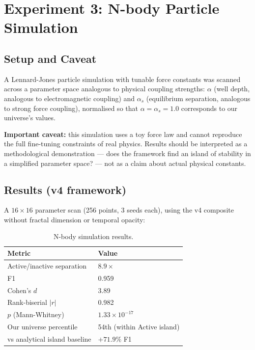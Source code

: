 \documentclass[12pt,a4paper]{article}
\begin{document}
\section{Experiment 3: N-body Particle Simulation}

\subsection{Setup and Caveat}

A Lennard-Jones particle simulation with tunable force constants was
scanned across a parameter space analogous to physical coupling
strengths: $\alpha$ (well depth, analogous to electromagnetic
coupling) and $\alpha_s$ (equilibrium separation, analogous to strong
force coupling), normalised so that $\alpha=\alpha_s=1.0$ corresponds
to our universe's values.

\textbf{Important caveat:} this simulation uses a toy force law and
cannot reproduce the full fine-tuning constraints of real physics.
Results should be interpreted as a methodological demonstration ---
does the framework find an island of stability in a simplified
parameter space? --- not as a claim about actual physical constants.

\subsection{Results (v4 framework)}

A $16\times16$ parameter scan (256 points, 3 seeds each), using the
v4 composite without fractal dimension or temporal opacity:

\begin{table}[h]
\centering
\caption{N-body simulation results.}
\begin{tabular}{ll}
\toprule
Metric & Value \\
\midrule
Active/inactive separation & $8.9\times$ \\
F1 & 0.959 \\
Cohen's $d$ & 3.89 \\
Rank-biserial $|r|$ & 0.982 \\
$p$ (Mann-Whitney) & $1.33\times10^{-17}$ \\
Our universe percentile & 54th (within Active island) \\
vs analytical island baseline & $+71.9\%$ F1 \\
\bottomrule
\end{tabular}
\end{table}
\end{document}
